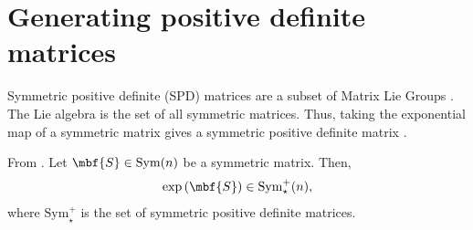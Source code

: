 \section{Generating positive definite matrices}
Symmetric positive definite (SPD) matrices are a subset of Matrix Lie Groups \cite{arsignyGeometricMeansNovel2007}.
The Lie algebra is the set of all symmetric matrices.
Thus, taking the exponential map of a symmetric matrix gives a symmetric positive definite matrix \cite[Prop.~3.4]{arsignyGeometricMeansNovel2007}.
\begin{proposition}
    From \cite[Prop.~3.4]{arsignyGeometricMeansNovel2007}. Let $\mbf{S}\in \mathrm{Sym}(n)$ be a symmetric matrix. Then,
    \begin{align}
        \exp\left( \mbf{S} \right) \in \mathrm{Sym}^{+}_{\star}(n),
    \end{align}
    where $\mathrm{Sym}^{+}_{\star}$ is the set of symmetric positive definite matrices. 
\end{proposition}
